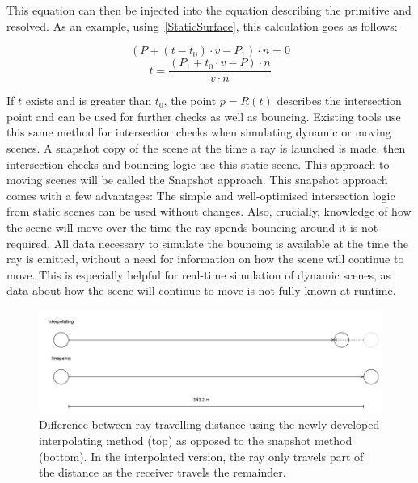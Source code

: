 This equation can then be injected into the equation describing the primitive and resolved.
As an example, using~\eqref{StaticSurface}, this calculation goes as follows:

\begin{equation*}
    (P + (t - t_0) \cdot v - P_1) \cdot n = 0
\end{equation*}
\begin{equation}\label{StaticSurfaceIntersect}
    t = \frac{(P_1 + t_0 \cdot v - P) \cdot n}{v \cdot n}
\end{equation}

If \(t\) exists and is greater than \(t_0\),
the point \(p = R(t)\) describes the intersection point and can be used for further checks
as well as bouncing.
\newline
Existing tools use this same method for intersection checks when simulating dynamic or moving scenes.
A snapshot copy of the scene at the time a ray is launched is made,
then intersection checks and bouncing logic use this static scene.
This approach to moving scenes will be called the Snapshot approach.
\newline
This snapshot approach comes with a few advantages:
The simple and well-optimised intersection logic from static scenes can be used without changes.
Also, crucially, knowledge of how the scene will move over the time the ray spends bouncing around it is not required.
All data necessary to simulate the bouncing is available at the time the ray is emitted,
without a need for information on how the scene will continue to move.
This is especially helpful for real-time simulation of dynamic scenes, as data about how the scene will continue to move is not
fully known at runtime.
\newline
\begin{figure}\label{SnapshotExplain}
    \includegraphics[width=\linewidth]{images/snapshot_explain.jpg}
    \caption{Difference between ray travelling distance using the newly developed interpolating method (top) as opposed to the snapshot method (bottom). In the interpolated version, the ray only travels part of the distance as the receiver travels the remainder.}
\end{figure}
